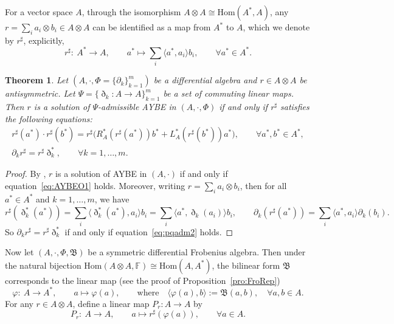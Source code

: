 \documentclass[10pt,a4paper]{amsart}
\numberwithin{equation}{section}
\newtheorem{Theorem}{Theorem}[section]
\newcommand{\Hom}{\mathrm{Hom}}
\begin{document}
For a vector space $A$, through the isomorphism $A \otimes A \cong \Hom(A^*,A)$, any $r = \sum_{i} a_i \otimes b_i \in A \otimes A$ can be identified as a map from $A^*$ to $A$, which we denote by $r^\sharp$, explicitly,
\begin{equation*}
 r^\sharp\colon \ A^* \to A, \qquad a^* \mapsto \sum_{i} \langle a^*, a_i \rangle b_i, \qquad
 \forall a^* \in A^*.
\end{equation*}

\begin{Theorem}\label{thm:AYBEO}
 Let $(A, \cdot, \Phi = \{\partial_k\}_{k=1}^m)$ be a differential algebra and $r \in A \otimes A$ be antisymmetric.
 Let $\Psi = \{\eth_k\colon A \to A\}_{k=1}^m$ be a set of commuting linear maps.
 Then $r$ is a solution of $\Psi$-admissible AYBE in $(A, \cdot, \Phi)$ if and only if $r^\sharp$
 satisfies the following equations:
 \begin{gather}
 r^\sharp(a^*) \cdot r^\sharp(b^*) = r^\sharp\big( R^*_A(r^\sharp(a^*)) b^* + L^*_A(r^\sharp(b^*)) a^* \big), \qquad \forall a^*, b^* \in A^*, \label{eq:AYBEO1} \\
 \partial_k r^\sharp = r^\sharp \eth_k^*, \qquad \forall k=1, \dots, m. \label{eq:AYBEO2}
 \end{gather}
\end{Theorem}
\begin{proof}
 By \cite[Proposition~2.4.7]{BaiDouble},
 $r$ is a solution of AYBE in $(A, \cdot)$ if and only if equation~\eqref{eq:AYBEO1} holds.
 Moreover, writing $r = \sum_i a_i \otimes b_i$, then for all $a^* \in A^*$ and $k=1, \dots,
 m$, we have
 \begin{equation*}
 r^\sharp(\eth_k^*(a^*)) = \sum_{i} \langle \eth_k^*(a^*), a_i \rangle b_i = \sum_{i} \langle a^*, \eth_k(a_i) \rangle b_i, \qquad \partial_k(r^\sharp(a^*)) = \sum_{i}\langle a^*, a_i \rangle \partial_k(b_i).
 \end{equation*}
 So $\partial_k r^\sharp = r^\sharp \eth_k^*$ if and only if equation~\eqref{eq:pqadm2} holds.
\end{proof}


Now let $(A, \cdot, \Phi, \mathfrak{B})$ be a symmetric
differential Frobenius algebra. Then under the natural bijection
$\Hom(A \otimes A, \mathbb{F}) \cong \Hom(A, A^*)$, the bilinear
form $\mathfrak{B}$ corresponds to the linear map (see the proof
of Proposition~\ref{pro:FroRep})
\begin{equation*}
 \varphi\colon \ A \to A^*, \qquad a \mapsto \varphi(a),\qquad
 \text{where} \quad \langle \varphi(a), b \rangle := \mathfrak{B}(a, b), \quad
 \forall a, b \in A.
\end{equation*}
For any $r \in A \otimes A$, define a linear map $P_r\colon A \to A$ by
\begin{equation*}
 P_r\colon \ A \to A, \qquad a \mapsto r^\sharp(\varphi(a)), \qquad \forall a \in A.
\end{equation*}
\end{document}
